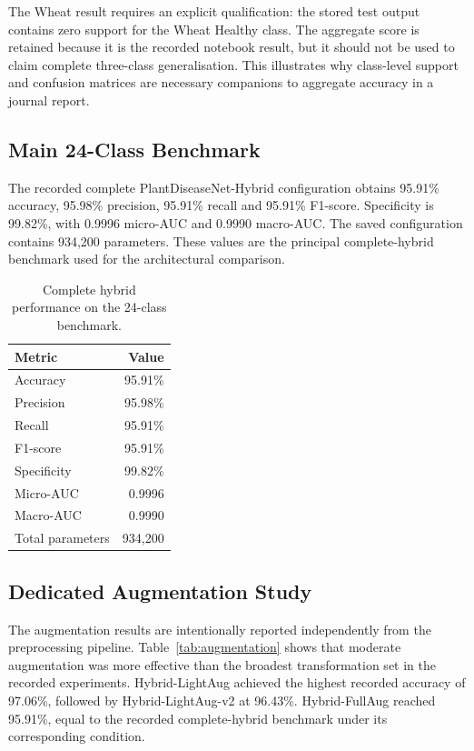 \documentclass[a4paper,fleqn]{cas-dc}
\begin{document}
The Wheat result requires an explicit qualification: the stored test output contains zero support for the Wheat Healthy class. The aggregate score is retained because it is the recorded notebook result, but it should not be used to claim complete three-class generalisation. This illustrates why class-level support and confusion matrices are necessary companions to aggregate accuracy in a journal report.

\subsection{Main 24-Class Benchmark}
The recorded complete PlantDiseaseNet-Hybrid configuration obtains 95.91\% accuracy, 95.98\% precision, 95.91\% recall and 95.91\% F1-score. Specificity is 99.82\%, with 0.9996 micro-AUC and 0.9990 macro-AUC. The saved configuration contains 934,200 parameters. These values are the principal complete-hybrid benchmark used for the architectural comparison.

\begin{table}[!t]
\centering
\caption{Complete hybrid performance on the 24-class benchmark.}
\label{tab:main24}
\begin{tabular}{lr}
\toprule
Metric & Value \\
\midrule
Accuracy & 95.91\% \\
Precision & 95.98\% \\
Recall & 95.91\% \\
F1-score & 95.91\% \\
Specificity & 99.82\% \\
Micro-AUC & 0.9996 \\
Macro-AUC & 0.9990 \\
Total parameters & 934,200 \\
\bottomrule
\end{tabular}
\end{table}

\subsection{Dedicated Augmentation Study}
The augmentation results are intentionally reported independently from the preprocessing pipeline. Table~\ref{tab:augmentation} shows that moderate augmentation was more effective than the broadest transformation set in the recorded experiments. Hybrid-LightAug achieved the highest recorded accuracy of 97.06\%, followed by Hybrid-LightAug-v2 at 96.43\%. Hybrid-FullAug reached 95.91\%, equal to the recorded complete-hybrid benchmark under its corresponding condition.
\end{document}
